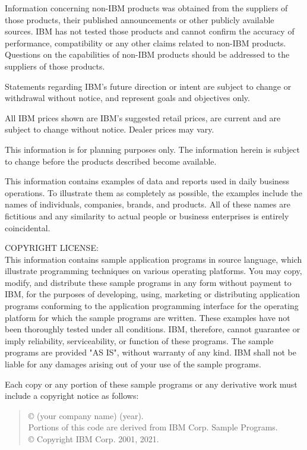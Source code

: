 Information concerning non-IBM products was obtained from the suppliers of
those products, their published announcements or other publicly available
sources.  IBM has not tested those products and cannot confirm the
accuracy of performance, compatibility or any other claims related to
non-IBM products.  Questions on the capabilities of non-IBM products
should be addressed to the suppliers of those products.

Statements regarding IBM's future direction or intent are subject to
change or withdrawal without notice, and represent goals and objectives
only.

All IBM prices shown are IBM's suggested retail prices, are current and
are subject to change without notice.  Dealer prices may vary.

This information is for planning purposes only.  The information herein is
subject to change before the products described become available.

This information contains examples of data and reports used in daily
business operations.  To illustrate them as completely as possible, the
examples include the names of individuals, companies, brands, and
products.  All of these names are fictitious and any similarity to actual
people or business enterprises is entirely coincidental.

\medskip
COPYRIGHT LICENSE:\\\nopagebreak
This information contains sample application programs in source language,
which illustrate programming techniques on various operating platforms.
You may copy, modify, and distribute these sample programs in any form
without payment to IBM, for the purposes of developing, using, marketing
or distributing application programs conforming to the application
programming interface for the operating platform for which the sample
programs are written.  These examples have not been thoroughly tested
under all conditions.  IBM, therefore, cannot guarantee or imply
reliability, serviceability, or function of these programs.  The sample
programs are provided "AS IS", without warranty of any kind.  IBM shall
not be liable for any damages arising out of your use of the sample
programs.

Each copy or any portion of these sample programs or any derivative work
must include a copyright notice as follows:

\begin{quote}
  © (your company name) (year).\\
  Portions of this code are derived from IBM Corp. Sample Programs.\\
  © Copyright IBM Corp. 2001, 2021.
\end{quote}

